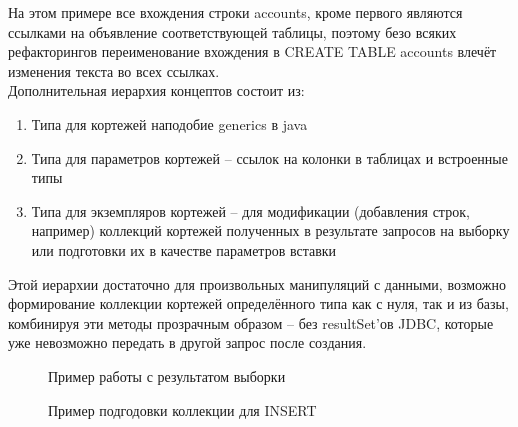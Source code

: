 \documentclass[12pt]{article}
\begin{document}
На этом примере все вхождения строки accounts, кроме первого являются ссылками на объявление соответствующей таблицы, поэтому безо всяких рефакторингов переименование вхождения в CREATE TABLE accounts влечёт изменения текста во всех ссылках.\\

Дополнительная иерархия концептов состоит из:
\begin{enumerate}
\item Типа для кортежей наподобие generics в java
\item Типа для параметров кортежей -- ссылок на колонки в таблицах и встроенные типы
\item Типа для экземпляров кортежей -- для модификации (добавления строк, например) коллекций кортежей полученных в результате запросов на выборку или подготовки их в качестве параметров вставки
\end{enumerate}
Этой иерархии достаточно для произвольных манипуляций с данными, возможно формирование коллекции кортежей определённого типа как с нуля, так и из базы, комбинируя эти методы прозрачным образом -- без resultSet'ов JDBC, которые уже невозможно передать в другой запрос после создания.\\

\begin{figure}[h]
\caption{Пример работы с результатом выборки}
\end{figure}

\begin{figure}[h]
\caption{Пример подгодовки коллекции для INSERT}
\end{figure}
\end{document}
